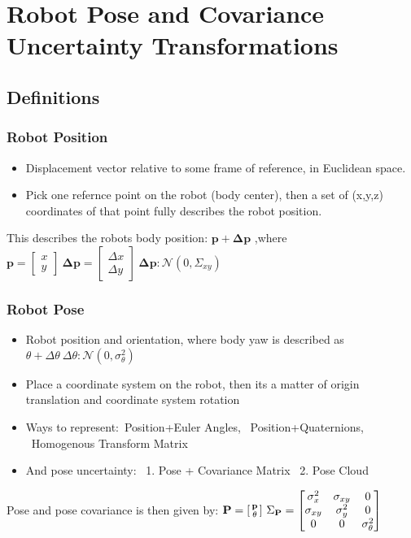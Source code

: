 \section{Robot Pose and Covariance Uncertainty Transformations}

\subsection{Definitions}

\subsubsection{Robot Position}
\begin{itemize}
  \item Displacement vector relative to some frame of reference, in Euclidean space.
  \item Pick one refernce point on the robot (body center), then a set of (x,y,z) coordinates of that point fully describes the robot position.
\end{itemize}
This describes the robots body position: $\mathbf{p} + \mathbf{\Delta p}$
,where $\mathbf{p} = \begin{bmatrix} x \\ y \end{bmatrix} \ \mathbf{\Delta p} = \begin{bmatrix} \Delta x \\ \Delta y \end{bmatrix} \ \mathbf{\Delta p}: \mathcal{N}(0, \Sigma_{xy})$

\subsubsection{Robot Pose}
\begin{itemize}
  \item Robot position and orientation, where body yaw is described as $\theta + \Delta \theta \ \Delta \theta: \mathcal{N}(0, \sigma_{\theta}^2)$
  \item Place a coordinate system on the robot, then its a matter of origin translation and coordinate system rotation
  \item Ways to represent:\ Position+Euler Angles, \ Position+Quaternions, \  Homogenous Transform Matrix
  \item And pose uncertainty: \ 1. Pose + Covariance Matrix \ 2. Pose Cloud
\end{itemize}

Pose and pose covariance is then given by: $\mathbf{P} = \begin{bsmallmatrix} \mathbf{p} \\ \theta \end{bsmallmatrix} \ \Sigma_{\mathbf{P}} =
\begin{bmatrix}
\sigma_x^2 & \sigma_{xy} & 0 \\
\sigma_{xy} & \sigma_y^2 & 0 \\
0 & 0 & \sigma_{\theta}^2
\end{bmatrix}$

